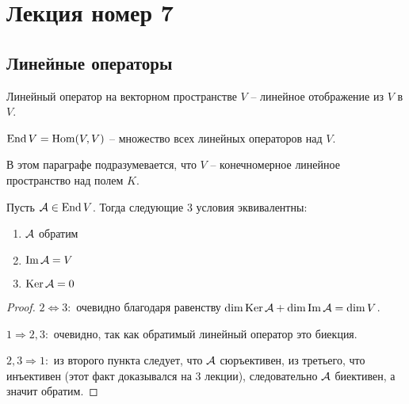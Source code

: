 \section{Лекция номер 7}
\subsection{Линейные операторы}
\begin{conj}
    Линейный оператор на векторном пространстве $V$ -- линейное отображение из $V$ в $V$.

    $\operatorname{End} V = \operatorname{Hom}(V, V)$ -- множество всех линейных операторов над $V$.
\end{conj}

В этом параграфе подразумевается, что $V$ -- конечномерное линейное пространство над полем $K$.

\begin{theorem-non}
    Пусть $\mathcal{A} \in \operatorname{End} V$. Тогда следующие 3 условия эквивалентны:
    \begin{enumerate}
        \item $\mathcal{A}$ обратим
        \item $\operatorname{Im} \mathcal{A} = V$
        \item $\operatorname{Ker} \mathcal{A} = 0$
    \end{enumerate}
\end{theorem-non}
\begin{proof} \quad 

    \quad$2 \Leftrightarrow 3:$ очевидно благодаря равенству $\dim \operatorname{Ker} \mathcal{A} + \dim \operatorname{Im} \mathcal{A} = \dim V$.
    
    \quad$1 \Rightarrow 2, 3:$ очевидно, так как обратимый линейный оператор это биекция.

    \quad$2, 3 \Rightarrow 1:$ из второго пункта следует, что $\mathcal{A}$ сюръективен, из третьего, что инъективен (этот факт доказывался на 3 лекции), следовательно $\mathcal{A}$ биективен, а значит обратим.
\end{proof}

